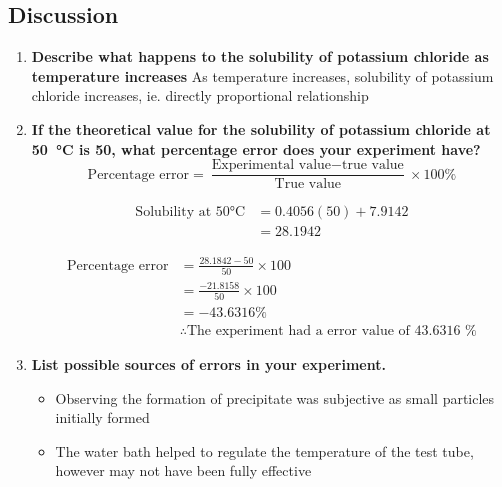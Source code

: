 	\subsection{Discussion}
		\begin{enumerate}
			\item \textbf{Describe what happens to the solubility of potassium chloride as temperature increases}
				\subitem As temperature increases, solubility of potassium chloride increases, ie. directly proportional relationship
			\item \textbf{If the theoretical value for the solubility of potassium chloride at \qty{50}{\degreeCelsius} is \qty{50}{\solubility}, what percentage error does your experiment have?}
			$$\text{Percentage error} = \frac{\text{Experimental value} - \text{true value}}{\text{True value}} \times 100\%$$

			\begin{align*}
				\text{Solubility at 50} \unit{\degreeCelsius} &= 0.4056(50) + 7.9142 \\
				&= 28.1942
			\end{align*}

			\begin{align*}
				\text{Percentage error} &= \frac{28.1842 - 50}{50} \times 100 \\
				&= \frac{-21.8158}{50} \times 100 \\
				&= -43.6316 \% \\
				&\therefore \text{The experiment had a error value of 43.6316 \%}
			\end{align*}
			
			\item \textbf{List possible sources of errors in your experiment.}
				\begin{itemize}
					\item Observing the formation of precipitate was subjective as small particles initially formed
					\item The water bath helped to regulate the temperature of the test tube, however may not have been fully effective
				\end{itemize}
		\end{enumerate}